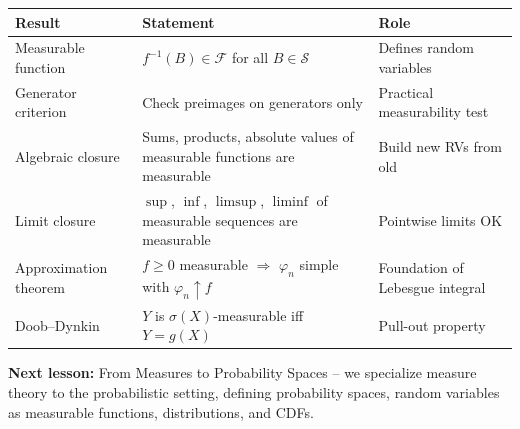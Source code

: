 \documentclass[11pt,a4paper]{article}
\begin{document}
\begin{center}
\renewcommand{\arraystretch}{1.4}
\begin{tabular}{p{4.5cm} p{5cm} p{4.5cm}}
\toprule
\textbf{Result} & \textbf{Statement} & \textbf{Role} \\
\midrule
Measurable function & $f^{-1}(B) \in \mathcal{F}$ for all
  $B \in \mathcal{S}$ & Defines random variables \\
Generator criterion & Check preimages on generators only &
  Practical measurability test \\
Algebraic closure & Sums, products, absolute values of measurable
  functions are measurable & Build new RVs from old \\
Limit closure & $\sup$, $\inf$, $\limsup$, $\liminf$ of measurable
  sequences are measurable & Pointwise limits OK \\
Approximation theorem & $f \geq 0$ measurable $\Rightarrow$
  $\varphi_n$ simple with $\varphi_n \uparrow f$ &
  Foundation of Lebesgue integral \\
Doob--Dynkin & $Y$ is $\sigma(X)$-measurable iff $Y = g(X)$ &
  Pull-out property \\
\bottomrule
\end{tabular}
\end{center}

\medskip
\noindent\textbf{Next lesson:} From Measures to Probability Spaces -- we
specialize measure theory to the probabilistic setting, defining
probability spaces, random variables as measurable functions, distributions,
and CDFs.


\end{document}
